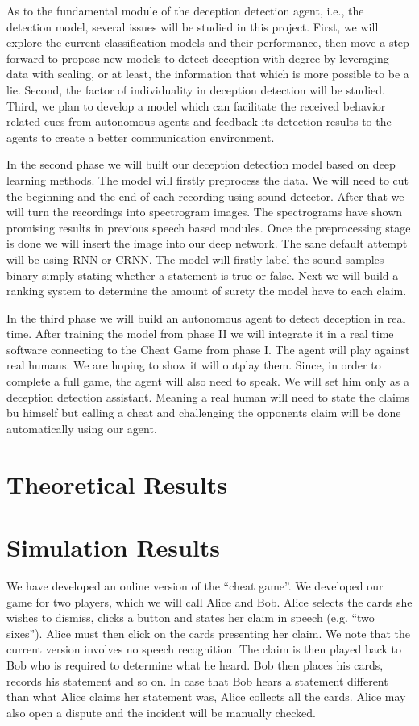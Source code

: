 As to the fundamental module of the deception detection agent, i.e., the detection model, several issues will be studied in this project. First, we will explore the current classification models and their performance, then move a step forward to propose new models to detect deception with degree by leveraging data with scaling, or at least, the information that which is more possible to be a lie. Second, the factor of individuality in deception detection will be studied. Third, we plan to develop a model which can facilitate the received behavior related cues from autonomous agents and feedback its detection results to the agents to create a better communication environment. 

In the second phase we will built our deception detection model based on deep learning methods. The model will firstly preprocess the data. We will need to cut the beginning and the end of each recording using sound detector. After that we will turn the recordings into spectrogram images. The spectrograms have shown promising results in previous speech based modules. Once the preprocessing stage is done we will insert the image into our deep network. The sane default attempt will be using RNN or CRNN. The model will firstly label the sound samples binary simply stating whether a statement is true or false. Next we will build a ranking system to determine the amount of surety the model have to each claim. 

In the third phase we will build an autonomous agent to detect deception in real time. After training the model from phase II we will integrate it in a real time software connecting to the Cheat Game from phase I. The agent will play against real humans. We are hoping to show it will outplay them. Since, in order to complete a full game, the agent will also need to speak. We will set him only as a deception detection assistant. Meaning a real human will need to state the claims bu himself but calling a cheat and challenging the opponents claim will be done automatically using our agent.  


\section {Theoretical Results}


\section {Simulation Results}

We have developed an online version of the ``cheat game''.  We developed our game for two players, which we will call Alice and Bob. 
Alice selects the cards she wishes to dismiss, clicks a button and states her claim in speech (e.g. ``two sixes''). Alice must then click on the cards presenting her claim. We note that the current version involves no speech recognition. The claim is then played back to Bob who is required  to determine what he heard. Bob then places his cards, records his statement and so on. In case that Bob hears a statement different than what Alice claims her statement was, Alice collects all the cards. Alice may also open a dispute and the incident will be manually checked.

